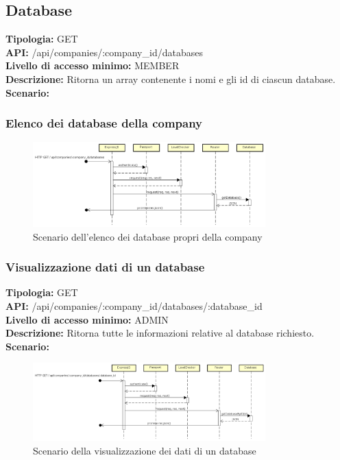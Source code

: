 \newpage
\subsection{Database}
\textbf{Tipologia:} GET \\
\textbf{API:} /api/companies/:company\_id/databases \\
\textbf{Livello di accesso minimo:} MEMBER \\
\textbf{Descrizione:} Ritorna un array contenente i nomi e gli id di ciascun database. \\
\textbf{Scenario:}
\subsubsection{Elenco dei database della company}
\begin{figure}[h]
\centering
\includegraphics[width=0.8\textwidth]{res/sections/backend/(GET)database.png}
\caption{Scenario dell'elenco dei database propri della company}
\end{figure}

\newpage
\subsubsection{Visualizzazione dati di un database}
\textbf{Tipologia:} GET \\
\textbf{API:} /api/companies/:company\_id/databases/:database\_id \\
\textbf{Livello di accesso minimo:} ADMIN \\
\textbf{Descrizione:} Ritorna tutte le informazioni relative al database richiesto. \\
\textbf{Scenario:} 
\begin{figure}[h]
\centering
\includegraphics[width=0.8\textwidth]{res/sections/backend/(GET)databaseById.png}
\caption{Scenario della visualizzazione dei dati di un database}
\end{figure}

